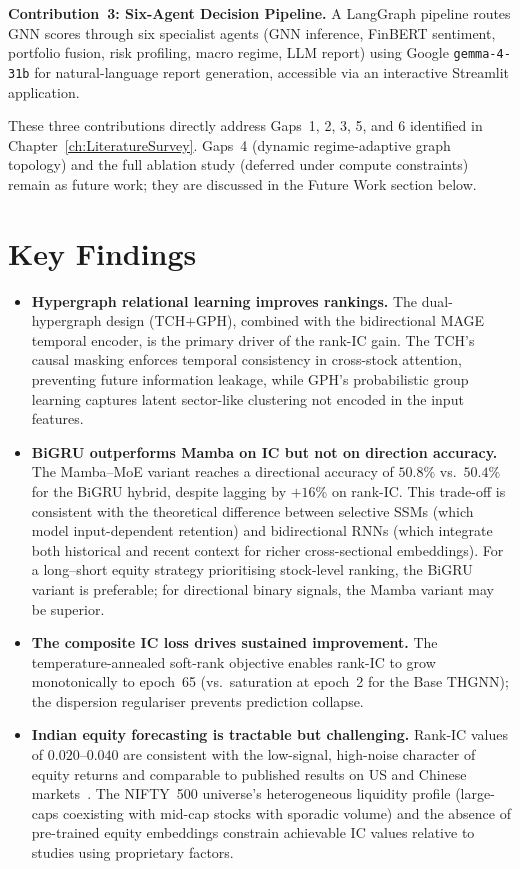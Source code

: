 \documentclass[a4paper,11pt]{report}
\begin{document}
\textbf{Contribution~3: Six-Agent Decision Pipeline.} A LangGraph pipeline routes GNN scores through six specialist agents (GNN inference, FinBERT sentiment, portfolio fusion, risk profiling, macro regime, LLM report) using Google \texttt{gemma-4-31b} for natural-language report generation, accessible via an interactive Streamlit application.

These three contributions directly address Gaps~1, 2, 3, 5, and 6 identified in Chapter~\ref{ch:LiteratureSurvey}. Gaps~4 (dynamic regime-adaptive graph topology) and the full ablation study (deferred under compute constraints) remain as future work; they are discussed in the Future Work section below.

\section{Key Findings}

\begin{itemize}
    \item \textbf{Hypergraph relational learning improves rankings.} The dual-hypergraph design (TCH+GPH), combined with the bidirectional MAGE temporal encoder, is the primary driver of the rank-IC gain. The TCH's causal masking enforces temporal consistency in cross-stock attention, preventing future information leakage, while GPH's probabilistic group learning captures latent sector-like clustering not encoded in the input features.

    \item \textbf{BiGRU outperforms Mamba on IC but not on direction accuracy.} The Mamba--MoE variant reaches a directional accuracy of $50.8\%$ vs.\ $50.4\%$ for the BiGRU hybrid, despite lagging by $+16\%$ on rank-IC. This trade-off is consistent with the theoretical difference between selective SSMs (which model input-dependent retention) and bidirectional RNNs (which integrate both historical and recent context for richer cross-sectional embeddings). For a long--short equity strategy prioritising stock-level ranking, the BiGRU variant is preferable; for directional binary signals, the Mamba variant may be superior.

    \item \textbf{The composite IC loss drives sustained improvement.} The temperature-annealed soft-rank objective enables rank-IC to grow monotonically to epoch~65 (vs.\ saturation at epoch~2 for the Base THGNN); the dispersion regulariser prevents prediction collapse.

    \item \textbf{Indian equity forecasting is tractable but challenging.} Rank-IC values of $0.020$--$0.040$ are consistent with the low-signal, high-noise character of equity returns and comparable to published results on US and Chinese markets~\cite{li2024master,fan2024stockmixer}. The NIFTY~500 universe's heterogeneous liquidity profile (large-caps coexisting with mid-cap stocks with sporadic volume) and the absence of pre-trained equity embeddings constrain achievable IC values relative to studies using proprietary factors.
\end{itemize}
\end{document}
